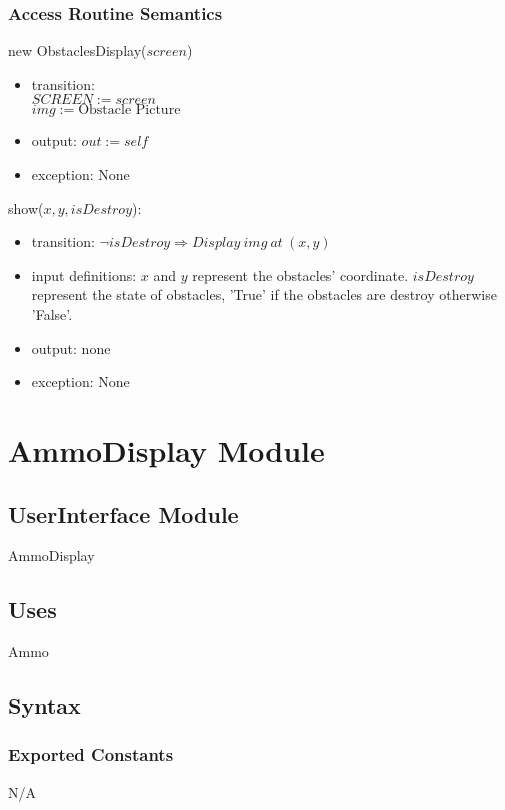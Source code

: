 \documentclass[12pt]{article}
\begin{document}
\subsubsection*{Access Routine Semantics}

new ObstaclesDisplay($screen$)
\begin{itemize}
    \item transition: \\
    $SCREEN := screen$\\
    $img := \text{Obstacle Picture}$
    \item output: $out := self$
    \item exception: None
\end{itemize}

\noindent show($x, y, isDestroy$):
\begin{itemize}
    \item transition: $\lnot isDestroy \Rightarrow Display\ img\ at\ (x, y)$
    \item input definitions: $x$ and $y$ represent the obstacles' coordinate. $isDestroy$ represent the state of obstacles, 'True' if the obstacles are destroy otherwise 'False'.
    \item output: none
    \item exception: None
\end{itemize}
\newpage

\section{AmmoDisplay Module}

\subsection*{UserInterface Module}
AmmoDisplay

\subsection*{Uses}
Ammo

\subsection*{Syntax}
\subsubsection*{Exported Constants}
N/A
\end{document}

